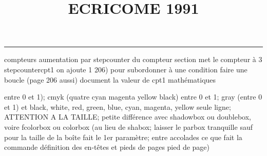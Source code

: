 \documentclass[11pt]{article}%
\title{\bf \vspace{-2cm} ECRICOME 1991} %
\author{} %
\date{} %
\renewcommand{\headrulewidth}{0pt}%
\renewcommand{\footrulewidth}{0.4pt}%
\begin{document}
\maketitle %
\vspace{-1.4cm}\hrule %
\thispagestyle{fancy}

\vspace*{.2cm}



compteurs%
aumentation par stepcounter du compteur section%
met le compteur à 3%
stepcounter{cpt1} on ajoute 1%
206) pour subordonner à une condition %
faire une boucle (page 206 aussi) %
document la valeur de cpt1 
mathématiques\newcommand{\ch}{\operatorname{ch}} 
\newcommand{\sh}{\operatorname{sh}}
\renewcommand{\tanh}{\operatorname{th}}
\renewcommand{\sinh}{\operatorname{sh}}
\renewcommand{\cosh}{\operatorname{ch}}
\newcommand{\argsh}{\operatorname{argsh}}
\newcommand{\argch}{\operatorname{argch}}
\newcommand{\argth}{\operatorname{argth}}
\newcommand{\Id}{\operatorname{Id}}
\renewcommand{\leq}{\leq}
\renewcommand{\geq}{\geq }

\newcommand{\dlim}{\lim}
\newcommand{\dsum}{\sum}
\newcommand{\dint}{\int}
\newcommand{\dprod}{\prod}



entre 0 et 1); cmyk (quatre cyan magenta yellow black) entre 0 et 1;
gray (entre 0 et 1) et black, white, red, green, blue, cyan, magenta,
yellow%
seule ligne; ATTENTION A LA TAILLE; petite différence avec shadowbox ou
doublebox, voire fcolorbox ou colorbox (au lieu de shabox; laisser le
parbox tranquille sauf pour la taille de la boîte
\newcommand{\Tbox}[1]{\begin{center} \shabox{\parbox{0.6
\linewidth}{#1}} \end{center}} %
fait le 1er paramètre; entre accolades ce que fait la commande
définition des en-têtes et pieds de pages\pagestyle{fancy}
\chead{}
\rfoot[ \ \thepage]{\thepage}
\cfoot{}
\lfoot{}
\thispagestyle{fancy} %
pied de page)\renewcommand{\footrulewidth}{0.4pt}
\renewcommand{\headrulewidth}{0.4pt}
\end{document}
